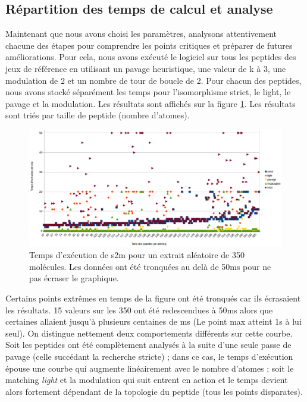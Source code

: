 \subsection{Répartition des temps de calcul et analyse}
\label{temps_calcul}

Maintenant que nous avons choisi les paramètres, analysons attentivement chacune des étapes pour comprendre les points critiques et préparer de futures améliorations.
Pour cela, nous avons exécuté le logiciel sur tous les peptides des jeux de référence en utilisant un pavage heuristique, une valeur de k à 3, une modulation de 2 et un nombre de tour de boucle de 2.
Pour chacun des peptides, nous avons stocké séparément les temps pour l'isomorphisme strict, le light, le pavage et la modulation.
Les résultats sont affichés sur la figure \ref{temps_calcul}.
Les résultats sont triés par taille de peptide (nombre d'atomes).

\begin{figure}[!ht]
  \begin{center}
    \includegraphics[width=450px]{Figures/s2m/results/temps_detail.png}
    \caption{\label{temps_calcul}Temps d'exécution de s2m pour un extrait aléatoire de 350 molécules.
    Les données ont été tronquées au delà de 50ms pour ne pas écraser le graphique.}
  \end{center}
\end{figure}

Certains points extrêmes en temps de la figure ont été tronqués car ils écrasaient les résultats.
15 valeurs sur les 350 ont été redescendues à 50ms alors que certaines allaient jusqu'à plusieurs centaines de ms (Le point max atteint 1s à lui seul).
On distingue nettement deux comportements différents sur cette courbe.
Soit les peptides ont été complètement analysés à la suite d'une seule passe de pavage (celle succédant la recherche stricte) ; dans ce cas, le temps d'exécution épouse une courbe qui augmente linéairement avec le nombre d'atomes ; soit le matching \textit{light} et la modulation qui suit entrent en action et le temps devient alors fortement dépendant de la topologie du peptide (tous les points disparates).

